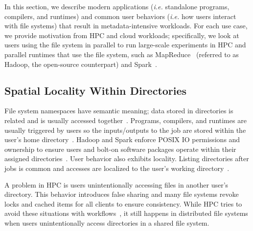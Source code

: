 In this section, we describe modern applications ({\it i.e.} standalone
programs, compilers, and runtimes) and common user behaviors ({\it i.e.} how
users interact with file systems) that result in metadata-intensive workloads.
For each use case, we provide motivation from HPC and cloud workloads;
specifically, we look at users using the file system in parallel to run
large-scale experiments in HPC and parallel runtimes that use the file system,
such as MapReduce~\cite{dean:osdi2004-mapreduce} (referred to as Hadoop, the
open-source counterpart) and Spark~\cite{zaharia:nsdi2012-spark}.

\subsection{Spatial Locality Within Directories}
\label{sec:spatial-locality-within-directories}

File system namespaces have semantic meaning; data stored in directories is
related and is usually accessed together~\cite{weil:osdi2006-ceph,
weil:sc2004-dyn-metadata}. Programs, compilers, and runtimes are usually
triggered by users so the inputs/outputs to the job are stored within the
user's home directory~\cite{weil:phdthesis07}. Hadoop and Spark enforce POSIX
IO permissions and ownership to ensure users and bolt-on software packages
operate within their assigned directories~\cite{docs:hadoopperm}.  User
behavior also exhibits locality. Listing directories after jobs is common and
accesses are localized to the user's working
directory~\cite{roselli:atec2000-FS-workloads, abad:ucc2012-mimesis}.

A problem in HPC is users unintentionally accessing files in another user's
directory. This behavior introduces false sharing and many file systems revoke
locks and cached items for all clients to ensure consistency. While HPC tries
to avoid these situations with workflows~\cite{zheng:pdsw2014-batchfs,
zheng:pdsw2015-deltafs}, it still happens in distributed file systems when
users unintentionally access directories in a shared file system. 


